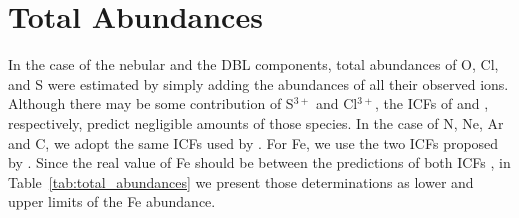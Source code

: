 \documentclass[twocolumn,linenumbers]{aastex63}
\newcommand{\eduardo}[1]{{\color{teal}E: #1}}
\newcounter{ionstage}
\renewcommand{\ion}[2]{\setcounter{ionstage}{#2}%
  \ensuremath{\mathrm{#1\,\scriptstyle\Roman{ionstage}}}}
\newcommand\oiii{[\ion{O}{3}]}
\newcommand\Mach{\ensuremath{\mathcal{M}}}
\begin{document}



\section{Total Abundances}
\label{sec:total_abun}


In the case of the nebular and the DBL components, total abundances of O, Cl, and S were estimated by simply adding the abundances of all their observed ions. Although there may be some contribution of S$^{3+}$ and Cl$^{3+}$, the ICFs of \citet{stasinska78} and \citet{Esteban15}, respectively, predict negligible amounts of those species. In the case of N, Ne, Ar and C, we adopt the same ICFs used by \citet{arellanocorodova20}. For Fe, we use the two ICFs proposed by  \citet{rodriguez05}. Since the real value of Fe should be between the predictions of both ICFs \citep{rodriguez05}, in Table~\ref{tab:total_abundances} we present those determinations as lower and upper limits of the Fe abundance. 
\end{document}
